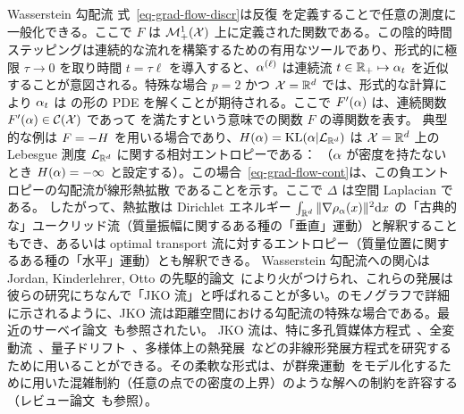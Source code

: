 \begin{rem2}{Wasserstein 勾配流}
式~\eqref{eq-grad-flow-discr}は反復
を定義することで任意の測度に一般化できる。ここで $F$ は $\mathcal{M}_+^1(\mathcal{X})$ 上に定義された関数である。この陰的時間ステッピングは連続的な流れを構築するための有用なツールであり、形式的に極限 $\tau \rightarrow 0$ を取り時間 $t=\tau \ell$ を導入すると、$\alpha^{(\ell)}$ は連続流 $t \in \mathbb{R}_+ \mapsto \alpha_t$ を近似することが意図される。特殊な場合 $p=2$ かつ $\mathcal{X}=\mathbb{R}^d$ では、形式的な計算により $\alpha_t$ は
の形の PDE を解くことが期待される。ここで $F'(\alpha)$ は、連続関数 $F'(\alpha) \in \mathcal{C}(\mathcal{X})$ であって
を満たすという意味での関数 $F$ の導関数を表す。
典型的な例は $F=-H$ を用いる場合であり、$H(\alpha)=\operatorname{KL}(\alpha|\mathcal{L}_{\mathbb{R}^d})$ は $\mathcal{X}=\mathbb{R}^d$ 上の Lebesgue 測度 $\mathcal{L}_{\mathbb{R}^d}$ に関する相対エントロピーである：
（$\alpha$ が密度を持たないとき $H(\alpha)=-\infty$ と設定する）。この場合~\eqref{eq-grad-flow-cont}は、この負エントロピーの勾配流が線形熱拡散
であることを示す。ここで $\Delta$ は空間 Laplacian である。
したがって、熱拡散は Dirichlet エネルギー $\int_{\mathbb{R}^d} \|\nabla \rho_{\alpha}(x)\|^2 \mathrm{d} x$ の「古典的な」ユークリッド流（質量振幅に関するある種の「垂直」運動）と解釈することもでき、あるいは optimal transport 流に対するエントロピー（質量位置に関するある種の「水平」運動）とも解釈できる。
Wasserstein 勾配流への関心は Jordan, Kinderlehrer, Otto の先駆的論文~\citep{jordan1998variational}により火がつけられ、これらの発展は彼らの研究にちなんで「JKO 流」と呼ばれることが多い。\citet{ambrosio2006gradient}のモノグラフで詳細に示されるように、JKO 流は距離空間における勾配流の特殊な場合である。最近のサーベイ論文~\citep{santambrogio2017euclidean}も参照されたい。
JKO 流は、特に多孔質媒体方程式~\citep{otto2001geometry}、全変動流~\citep{carlier2017total}、量子ドリフト~\citep{GianazzaARMA}、多様体上の熱発展~\citep{ErbarHeatManifold}などの非線形発展方程式を研究するために用いることができる。その柔軟な形式は、\citeauthor{maury2010macroscopic}が群衆運動~\citep{maury2010macroscopic}をモデル化するために用いた混雑制約（任意の点での密度の上界）のような解への制約を許容する（レビュー論文~\citep{SantambrogioCrowdReview}も参照）。
\end{rem2}


